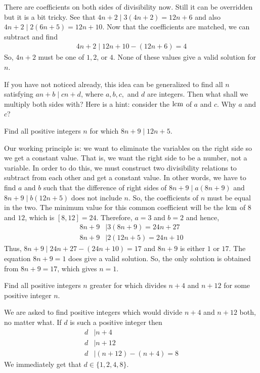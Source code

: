	\begin{solution}
		There are coefficients on both sides of divisibility now. Still it can be overridden but it is a bit tricky. See that $4n+2\mid 3(4n+2)=12n+6$ and also $4n+2 \mid 2(6n+5)=12n+10$. Now that the coefficients are matched, we can subtract and find
			\begin{align*}
				4n+2\mid 12n+10-(12n+6)=4
			\end{align*}
		So, $4n+2$ must be one of $1,2$, or $4$. None of these values give a valid solution for $n$.
	\end{solution}
If you have not noticed already, this idea can be generalized to find all $n$ satisfying $an+b\mid cn+d$, where $a,b,c,$ and $d$ are integers. Then what shall we multiply both sides with? Here is a hint: consider the $\operatorname{lcm}$ of $a$ and $c$. Why $a$ and $c$?
	\begin{problem}\label{prob:ex1}
		Find all positive integers $n$ for which $8n+9\mid 12n+5$.
	\end{problem}

	\begin{solution}
		Our working principle is: we want to eliminate the variables on the right side so we get a constant value. That is, we want the right side to be a number, not a variable. In order to do this, we must construct two divisibility relations to subtract from each other and get a constant value. In other words, we have to find $a$ and $b$ such that the difference of right sides of $8n+9 \mid a(8n+9)$ and $8n+9 \mid b(12n+5)$ does not include $n$. So, the coefficients of $n$ must be equal in the two. The minimum value for this common coefficient will be the $\operatorname{lcm}$ of $8$ and $12$, which is $[8,12]=24$. Therefore, $a=3$ and $b=2$ and hence,
			\begin{align*}
				8n+9 & \mid 3(8n+9) =24n+27\\
				8n+9 & \mid 2(12n+5) =24n+10
			\end{align*}
		Thus, $8n+9\mid 24n+27-(24n+10)=17$ and $8n+9$ is either $1$ or $17$. The equation $8n+9=1$ does give a valid solution. So, the only solution is obtained from $8n+9=17$, which gives $n=1$.
	\end{solution}

	\begin{problem}
		Find all positive integers $n$ greater for which divides $n+4$ and $n+12$ for some positive integer $n$.
	\end{problem}

	\begin{solution}
		We are asked to find positive integers which would divide $n+4$ and $n+12$ both, no matter what. If $d$ is such a positive integer then
			\begin{align*}
				d
					& \mid n+4\\
				d
					& \mid n+12\\
				d
					& \mid (n+12)-(n+4)=8
			\end{align*}
		We immediately get that $d\in\{1,2,4,8\}$.
	\end{solution}

